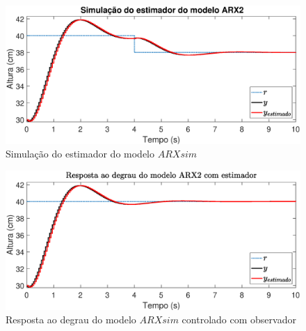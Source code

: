 \begin{figure}[H]
	\centering
	\includegraphics[width=1\linewidth]{estimadorarxsim}
	\caption[Simulação do estimador do modelo $ARXsim$]{Simulação do estimador do modelo $ARXsim$}
	\label{fig:estimadorarxsim}
\end{figure}

\begin{figure}[H]
	\centering
	\includegraphics[width=1\linewidth]{stepestarxsim}
	\caption[Resposta ao degrau do modelo $ARXsim$ controlado com observador]{Resposta ao degrau do modelo $ARXsim$ controlado com observador}
	\label{fig:stepestarxsim}
\end{figure}














